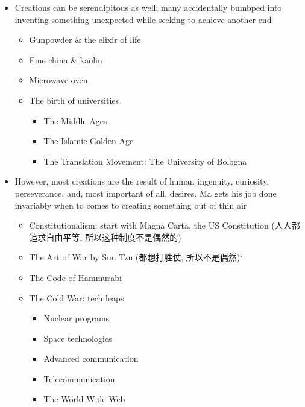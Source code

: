 \documentclass{article}
\begin{document}
      \begin{itemize}
        \item Creations can be serendipitous as well; many accidentally
        bumbped into inventing something unexpected while seeking to achieve
        another end
        \begin{itemize}
          \item Gunpowder \& the elixir of life
          \item Fine china \& kaolin
          \item Microwave oven
          \item The birth of universities
          \begin{itemize}
            \item The Middle Ages
            \item The Islamic Golden Age
            \item The Translation Movement: The University of Bologna
          \end{itemize}
        \end{itemize}

        \item However, most creations are the result of human ingenuity,
        curiosity, perseverance, and, most important of all, desires.
        Ma gets his job done invariably when to comes to creating something
        out of thin air
        \begin{itemize}
          \item Constitutionalism: start with Magna Carta, the US Constitution
          (人人都追求自由平等, 所以这种制度不是偶然的)

          \item The Art of War by Sun Tzu (都想打胜仗, 所以不是偶然)‘
          \item The Code of Hammurabi
          \item The Cold War: tech leaps
          \begin{itemize}
            \item Nuclear programs
            \item Space technologies
            \item Advanced communication
            \item Telecommunication
            \item The World Wide Web
          \end{itemize}


\end{itemize}
\end{itemize}
\end{document}
